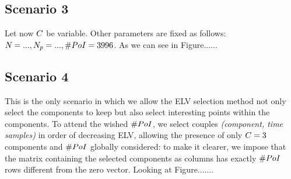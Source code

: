 \subsection{Scenario 3}
Let now $\newTraceLength$ be variable. Other parameters are fixed as follows: $\numTraces[] = ..., N_p=..., \numPoI = 3996$. As we can see in Figure......



\subsection{Scenario 4}
This is the only scenario in which we allow the ELV selection method not only select the components to keep but also select interesting points within the components. To attend the wished $\numPoI$, we select couples \textit{(component, time samples)} in order of decreasing ELV, allowing the presence of only $\newTraceLength = 3$ components and $\numPoI$ globally considered: to make it clearer, we impose that the matrix containing the selected components as columns has exactly $\numPoI$ rows different from the zero vector. Looking at Figure.......



